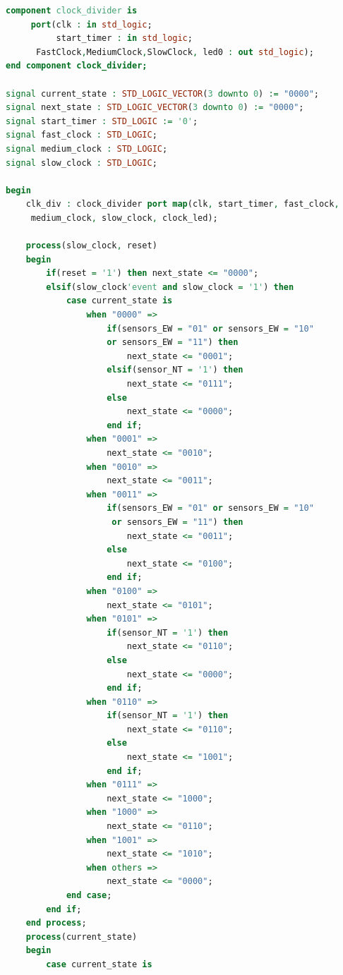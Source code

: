 \documentclass[11pt]{article}
\begin{document}
\begin{appendices}
\begin{lstlisting}[language=VHDL]
component clock_divider is
     port(clk : in std_logic;
          start_timer : in std_logic;
	  FastClock,MediumClock,SlowClock, led0 : out std_logic);
end component clock_divider;

signal current_state : STD_LOGIC_VECTOR(3 downto 0) := "0000";
signal next_state : STD_LOGIC_VECTOR(3 downto 0) := "0000";
signal start_timer : STD_LOGIC := '0';
signal fast_clock : STD_LOGIC;
signal medium_clock : STD_LOGIC;
signal slow_clock : STD_LOGIC;

begin
    clk_div : clock_divider port map(clk, start_timer, fast_clock,
     medium_clock, slow_clock, clock_led);
    
    process(slow_clock, reset)
    begin
        if(reset = '1') then next_state <= "0000";
        elsif(slow_clock'event and slow_clock = '1') then
            case current_state is
                when "0000" =>
                    if(sensors_EW = "01" or sensors_EW = "10" 
                    or sensors_EW = "11") then
                        next_state <= "0001";
                    elsif(sensor_NT = '1') then 
                        next_state <= "0111";
                    else
                        next_state <= "0000";
                    end if;
                when "0001" =>
                    next_state <= "0010";
                when "0010" =>
                    next_state <= "0011";
                when "0011" =>
                    if(sensors_EW = "01" or sensors_EW = "10"
                     or sensors_EW = "11") then
                        next_state <= "0011";
                    else
                        next_state <= "0100";
                    end if;
                when "0100" =>
                    next_state <= "0101";
                when "0101" =>
                    if(sensor_NT = '1') then
                        next_state <= "0110";
                    else
                        next_state <= "0000";
                    end if;
                when "0110" =>
                    if(sensor_NT = '1') then
                        next_state <= "0110";
                    else
                        next_state <= "1001";
                    end if;
                when "0111" =>
                    next_state <= "1000";
                when "1000" =>
                    next_state <= "0110";
                when "1001" =>
                    next_state <= "1010";
                when others =>
                    next_state <= "0000";
            end case;
        end if;
    end process;
    process(current_state)
    begin
        case current_state is

\end{lstlisting}
\end{appendices}
\end{document}
